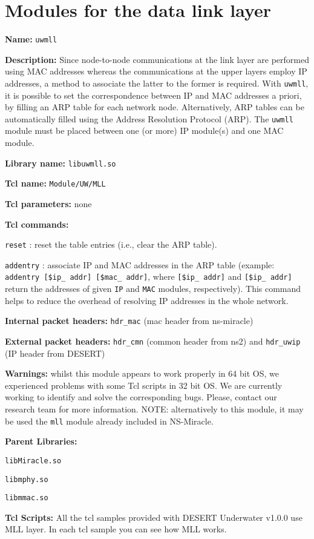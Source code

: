 \section{Modules for the data link layer}\label{sec:data_link}

\begin{description}
   \item {\bf Name:} {\tt uwmll}
   \item {\bf Description:} Since node-to-node communications at the link layer are performed using MAC addresses whereas the communications at the upper layers employ IP addresses, a method to associate the latter to the former is required.
   With {\tt uwmll}, it is possible to set the correspondence between IP and MAC addresses a priori, by filling an ARP table for each network node. Alternatively, ARP tables can be automatically filled using the Address Resolution Protocol (ARP). The {\tt uwmll} module must be placed between one (or more) IP module(s) and one MAC module.
   \item {\bf Library name:} {\tt libuwmll.so}
   \item {\bf Tcl name:} {\tt Module/UW/MLL}
   \item {\bf Tcl parameters:} none
   \item {\bf Tcl commands:} 
    \begin{description}
     \item{\tt reset} : reset the table entries (i.e., clear the ARP table).
     \item{\tt addentry} : associate IP and MAC addresses in the ARP table (example: {\tt  addentry [\$ip\_ addr] [\$mac\_ addr]}, where {\tt [\$ip\_ addr]} and {\tt [\$ip\_ addr]} return the addresses of given {\tt IP} and {\tt MAC} modules, respectively). This command helps to reduce the overhead of resolving IP addresses in the whole network. 
    \end{description}
   \item {\bf Internal packet headers:} {\tt hdr\_mac} (mac header from ns-miracle)
   \item {\bf External packet headers:} {\tt hdr\_cmn} (common header from ns2) and  {\tt hdr\_uwip} (IP header from DESERT)
   \item {\bf Warnings:} whilst this module appears to work properly in 64 bit OS, we experienced problems with some Tcl scripts in 32 bit OS. We are currently working to identify and solve the corresponding bugs. Please, contact our research team for more information.
NOTE: alternatively to this module, it may be used the {\tt mll} module already included in NS-Miracle.
   \item {\bf Parent Libraries:}
       \begin{description}
         \item {\tt libMiracle.so}
	      \item {\tt libmphy.so} 
	      \item {\tt libmmac.so}
        \end{description}
   \item {\bf Tcl Scripts:}  All the tcl samples provided with DESERT Underwater v1.0.0 use MLL layer. In each tcl sample you can see how MLL works.
\end{description}

